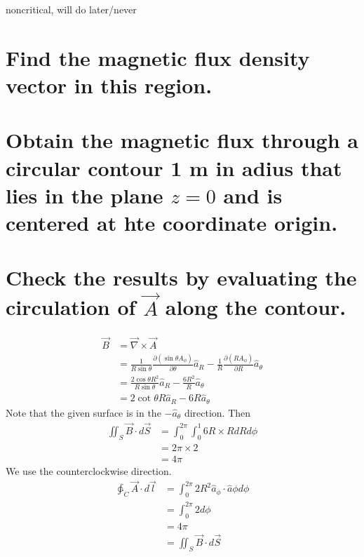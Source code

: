\documentclass[answers]{exam}
\begin{document}
\begin{questions}

\begin{solution}
	noncritical, will do later/never
\end{solution}


\begin{parts}
	\part{Find the magnetic flux density vector in this region.}
	\part{Obtain the magnetic flux through a circular contour 1 m in adius that lies in the plane $z=0$ and is centered at hte coordinate origin.}
	\part{Check the results by evaluating the circulation of $\vec A$ along the contour.}
\end{parts}

\begin{solution}
	\begin{align*}
		\vec B &= \vec \nabla \times \vec A \\
		       & = \frac{1}{R\sin\theta} \frac{\partial (\sin\theta A_\phi)}{\partial \theta} \hat a_R - \frac{1}{R} \frac{\partial (RA_\phi)}{\partial R} \hat a_\theta \\
		       &= \frac{2\cos\theta R^2}{R\sin\theta} \hat a_R - \frac{6R^2}{R} \hat a_\theta \\
		       &= 2\cot\theta R \hat a_R - 6R \hat a_\theta
	\end{align*}
	Note that the given surface is in the $-\hat a_\theta$ direction. Then
	\begin{align*}
		\iint_S \vec B \cdot d\vec S &= \int_0^{2\pi} \int_0^1 6R\times R dR d\phi \\
					     &= 2\pi \times 2 \\
					     &= 4\pi
	\end{align*}
	We use the counterclockwise direction.
	\begin{align*}
		\ointctrclockwise_C \vec A \cdot d\vec l &= \int_0^{2\pi} 2R^2 \hat a_\phi \cdot \hat a\phi d\phi \\
							&= \int_0^{2\pi} 2 d\phi \\
							&= 4\pi \\
							&= \iint_S \vec B \cdot d\vec S
	\end{align*}
\end{solution}


\end{questions}
\end{document}
